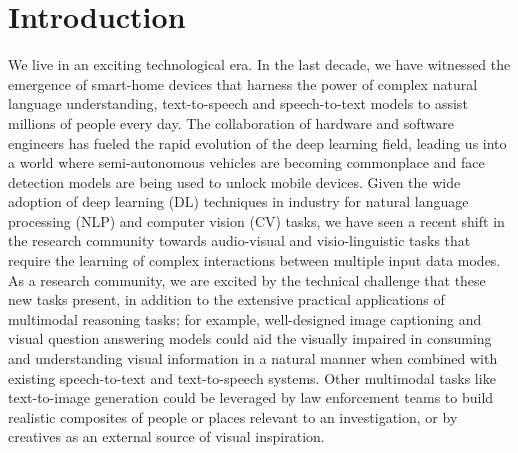 \chapter{Introduction}
\label{chapter:introduction}

We live in an exciting technological era. In the last decade, we have witnessed the emergence of smart-home devices that harness the power of complex natural language understanding, text-to-speech and speech-to-text models to assist millions of people every day. The collaboration of hardware and software engineers has fueled the rapid evolution of the deep learning field, leading us into a world where semi-autonomous vehicles are becoming commonplace and face detection models are being used to unlock mobile devices. Given the wide adoption of deep learning (DL) techniques in industry for natural language processing (NLP) and computer vision (CV) tasks, we have seen a recent shift in the research community towards audio-visual and visio-linguistic tasks that require the learning of complex interactions between multiple input data modes. As a research community, we are excited by the technical challenge that these new tasks present, in addition to the extensive practical applications of multimodal reasoning tasks; for example, well-designed image captioning and visual question answering models could aid the visually impaired in consuming and understanding visual information in a natural manner when combined with existing speech-to-text and text-to-speech systems. Other multimodal tasks like text-to-image generation could be leveraged by law enforcement teams to build realistic composites of people or places relevant to an investigation, or by creatives as an external source of visual inspiration.





